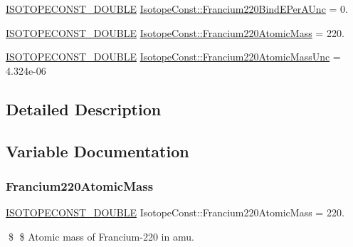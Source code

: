 \begin{DoxyCompactItemize}
\mbox{\hyperlink{group___isotope_const-_macros_ga8f45a7272ce02c0b4c65c44636ed719a}{I\+S\+O\+T\+O\+P\+E\+C\+O\+N\+S\+T\+\_\+\+D\+O\+U\+B\+LE}} \mbox{\hyperlink{group___isotope_const-_francium-_fr220_gaab9fef4066bec114bbd33596804ecbf6}{Isotope\+Const\+::\+Francium220\+Bind\+E\+Per\+A\+Unc}} = 0.
\item 
\mbox{\hyperlink{group___isotope_const-_macros_ga8f45a7272ce02c0b4c65c44636ed719a}{I\+S\+O\+T\+O\+P\+E\+C\+O\+N\+S\+T\+\_\+\+D\+O\+U\+B\+LE}} \mbox{\hyperlink{group___isotope_const-_francium-_fr220_ga67f1e5915a1d663cfb046f96cd657c9b}{Isotope\+Const\+::\+Francium220\+Atomic\+Mass}} = 220.
\item 
\mbox{\hyperlink{group___isotope_const-_macros_ga8f45a7272ce02c0b4c65c44636ed719a}{I\+S\+O\+T\+O\+P\+E\+C\+O\+N\+S\+T\+\_\+\+D\+O\+U\+B\+LE}} \mbox{\hyperlink{group___isotope_const-_francium-_fr220_ga992c62d58c4d323bb959e61fd32271d3}{Isotope\+Const\+::\+Francium220\+Atomic\+Mass\+Unc}} = 4.\+324e-\/06
\end{DoxyCompactItemize}


\subsection{Detailed Description}


\subsection{Variable Documentation}
\mbox{\label{group___isotope_const-_francium-_fr220_ga67f1e5915a1d663cfb046f96cd657c9b}} 
\subsubsection{\texorpdfstring{Francium220\+Atomic\+Mass}{Francium220AtomicMass}}
{\footnotesize\ttfamily \mbox{\hyperlink{group___isotope_const-_macros_ga8f45a7272ce02c0b4c65c44636ed719a}{I\+S\+O\+T\+O\+P\+E\+C\+O\+N\+S\+T\+\_\+\+D\+O\+U\+B\+LE}} Isotope\+Const\+::\+Francium220\+Atomic\+Mass = 220.}

\$ \$ Atomic mass of Francium-\/220 in amu. \mbox{\label{group___isotope_const-_francium-_fr220_ga992c62d58c4d323bb959e61fd32271d3}} 
